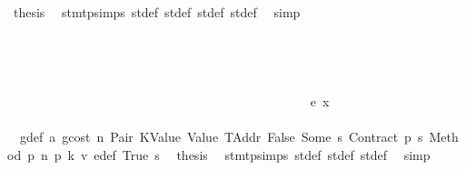 \begin{isabellebody}
\ {\isacharquery}{\kern0pt}thesis\ \isamarkupfalse%
\ stmt{\isachardot}{\kern0pt}psimps{\isacharparenleft}{\kern0pt}{}{\isacharparenright}{\kern0pt}\ st{\isacharprime}{\kern0pt}{\isacharunderscore}{\kern0pt}def\ st{\isacharprime}{\kern0pt}{\isacharprime}{\kern0pt}{\isacharunderscore}{\kern0pt}def\ st{\isacharprime}{\kern0pt}{\isacharprime}{\kern0pt}{\isacharprime}{\kern0pt}{\isacharunderscore}{\kern0pt}def\ st{\isacharprime}{\kern0pt}{\isacharprime}{\kern0pt}{\isacharprime}{\kern0pt}{\isacharprime}{\kern0pt}{\isacharunderscore}{\kern0pt}def\ \isamarkupfalse%
\ simp\isanewline
\ \ \ \ \ \ \ \ \ \ \ \ \ \ \ \ \ \ \ \ \ \ \ \ \ \ \ \ \ \ \ \ \ \ \ \ \ \ \ \ \ \ \ \ \ \ \ \ \ \ \isamarkupfalse%
\isanewline
\ \ \ \ \ \ \ \ \ \ \ \ \ \ \ \ \ \ \ \ \ \ \ \ \ \ \ \ \ \ \ \ \ \ \ \ \ \ \ \ \ \ \ \ \ \ \ \ \isamarkupfalse%
\isanewline
\ \ \ \ \ \ \ \ \ \ \ \ \ \ \ \ \ \ \ \ \ \ \ \ \ \ \ \ \ \ \ \ \ \ \ \ \ \ \ \ \ \ \ \ \ \ \isamarkupfalse%
\isanewline
\ \ \ \ \ \ \ \ \ \ \ \ \ \ \ \ \ \ \ \ \ \ \ \ \ \ \ \ \ \ \ \ \ \ \ \ \ \ \ \ \ \ \ \ \isamarkupfalse%
\isanewline
\ \ \ \ \ \ \ \ \ \ \ \ \ \ \ \ \ \ \ \ \ \ \ \ \ \ \ \ \ \ \ \ \ \ \ \ \ \ \ \ \ \ \ \ \ \ \isamarkupfalse%
\ {\isacharparenleft}{\kern0pt}e\ x{\isacharparenright}{\kern0pt}\isanewline
\ \ \ \ \ \ \ \ \ \ \ \ \ \ \ \ \ \ \ \ \ \ \ \ \ \ \ \ \ \ \ \ \ \ \ \ \ \ \ \ \ \ \ \ \ \ \isamarkupfalse%
\ {}{\isacharparenleft}{\kern0pt}{}{\isacharparenright}{\kern0pt}\ g{\isacharunderscore}{\kern0pt}def\ a{}\ gcost\ n\ Pair\ KValue\ Value\ TAddr\ False\ Some\ s{}\ Contract\ p{}\ s{}\ Method\ p{}\ n{}\ p{}\ k{}\ v\ e{\isacharprime}{\kern0pt}{\isacharunderscore}{\kern0pt}def\ True\ s{}\ \isamarkupfalse%
\ {\isacharquery}{\kern0pt}thesis\ \isamarkupfalse%
\ stmt{\isachardot}{\kern0pt}psimps{\isacharparenleft}{\kern0pt}{}{\isacharparenright}{\kern0pt}\ st{\isacharprime}{\kern0pt}{\isacharunderscore}{\kern0pt}def\ st{\isacharprime}{\kern0pt}{\isacharprime}{\kern0pt}{\isacharunderscore}{\kern0pt}def\ st{\isacharprime}{\kern0pt}{\isacharprime}{\kern0pt}{\isacharprime}{\kern0pt}{\isacharunderscore}{\kern0pt}def\ \isamarkupfalse%
\ simp\isanewline
\ \ \ \ \ \ \ \ \ \ \ \ \ \ \ \ \ \ \ \ \ \ \ \ \ \ \ \ \ \ \ \ \ \ \ \ \ \ \ \ \ \ \ \ \isamarkupfalse%
\isanewline
\ \ \ \ \ \ \ \ \ \ \ \ \ \ \ \ \ \ \ \ \ \ \ \ \ \ \ \ \ \ \ \ \ \ \ \ \ \ \ \ \ \ \isamarkupfalse%

\end{isabellebody}
